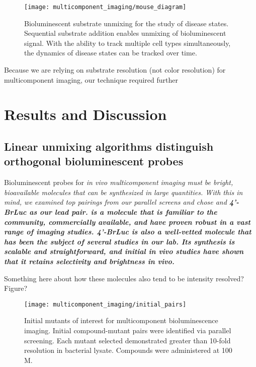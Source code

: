 \begin{figure}[htbp]
\texttt{[image: multicomponent\_imaging/mouse\_diagram]}
\centering
\caption[Bioluminescent substrate unmixing for the study of disease states]{
Bioluminescent substrate unmixing for the study of disease states. Sequential substrate addition enables unmixing of bioluminescent signal. With the ability to track multiple cell types simultaneously, the dynamics of disease states can be tracked over time.
}
  \label{fig:mouse_diagram}
\end{figure}

Because we are relying on substrate resolution (not color resolution) for multicomponent imaging, our technique required further 

\section{Results and Discussion}
\subsection{Linear unmixing algorithms distinguish orthogonal bioluminescent probes}
Bioluminescent probes for \it{in vivo} multicomponent imaging must be bright, bioavailable molecules that can be synthesized in large quantities. With this in mind, we examined top pairings from our parallel screens\cite{RathbunParallelScreeningRapid2017} and chose \dluc{} and \bf{4'-BrLuc} as our lead pair.
\dluciferin{} is a molecule that is familiar to the community, commercially available, and have proven robust in a vast range of imaging studies.\cite{PaleyBioluminescenceversatiletechnique2014}
\bf{4'-BrLuc} is also a well-vetted molecule that has been the subject of several studies in our lab. Its synthesis is scalable and straightforward,\cite{SteinhardtBrominatedLuciferinsAre2016} and initial \it{in vivo} studies have shown that it retains selectivity and brightness \it{in vivo.}\cite{RathbunParallelScreeningRapid2017}

\begin{thoughts}
  Something here about how these molecules also tend to be intensity resolved? Figure?
\end{thoughts}

\begin{figure}[htbp]
\texttt{[image: multicomponent\_imaging/initial\_pairs]}
\centering
\caption[Initial mutants of interest for multicomponent bioluminescence imaging]{Initial mutants of interest for multicomponent bioluminescence imaging. Initial compound-mutant pairs were identified via parallel screening.\cite{RathbunParallelScreeningRapid2017} Each mutant selected demonstrated greater than 10-fold resolution in bacterial lysate. Compounds were administered at 100 \textmu{}M.
}
  \label{fig:initial_pairs}
\end{figure}

